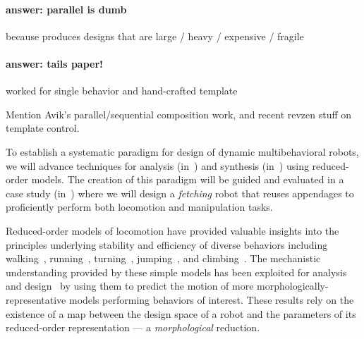 \documentclass[11pt]{article}
\begin{document}


\paragraph{answer:  parallel is dumb} because produces designs that are large / heavy / expensive / fragile


\paragraph{answer:  tails paper!}  worked for single behavior and hand-crafted template

Mention Avik's parallel/sequential composition work, and recent revzen stuff on template control.


To establish a systematic paradigm for design of dynamic multibehavioral robots,
we will advance techniques for analysis (in~) and synthesis (in~) using reduced-order models.
The creation of this paradigm will be guided and evaluated in a case study (in~) where we will design a \emph{fetching} robot that reuses appendages to proficiently perform both locomotion and manipulation tasks.

Reduced-order models of locomotion have provided valuable insights into the principles underlying stability and efficiency of diverse behaviors including walking~, running~,
turning~, 
jumping~,
and climbing~.
The mechanistic understanding provided by these simple models has been exploited for analysis~ and design~ by using them to predict the motion of more morphologically-representative models performing behaviors of interest. 
These results rely on the existence of a map between the design space of a robot
and the parameters of its reduced-order representation --- a \emph{morphological} reduction.  
\end{document}
